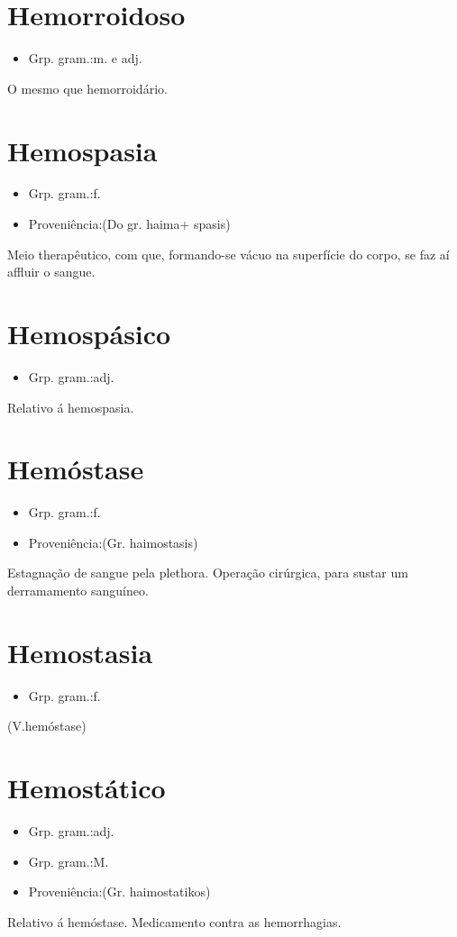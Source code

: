 \documentclass{article}
\begin{document}
\section{Hemorroidoso}
\begin{itemize}
\item {Grp. gram.:m. e adj.}
\end{itemize}
O mesmo que \textunderscore hemorroidário\textunderscore .
\section{Hemospasia}
\begin{itemize}
\item {Grp. gram.:f.}
\end{itemize}
\begin{itemize}
\item {Proveniência:(Do gr. \textunderscore haima\textunderscore  + \textunderscore spasis\textunderscore )}
\end{itemize}
Meio therapêutico, com que, formando-se vácuo na superfície do corpo, se faz aí affluir o sangue.
\section{Hemospásico}
\begin{itemize}
\item {Grp. gram.:adj.}
\end{itemize}
Relativo á hemospasia.
\section{Hemóstase}
\begin{itemize}
\item {Grp. gram.:f.}
\end{itemize}
\begin{itemize}
\item {Proveniência:(Gr. \textunderscore haimostasis\textunderscore )}
\end{itemize}
Estagnação de sangue pela plethora.
Operação cirúrgica, para sustar um derramamento sanguíneo.
\section{Hemostasia}
\begin{itemize}
\item {Grp. gram.:f.}
\end{itemize}
(V.hemóstase)
\section{Hemostático}
\begin{itemize}
\item {Grp. gram.:adj.}
\end{itemize}
\begin{itemize}
\item {Grp. gram.:M.}
\end{itemize}
\begin{itemize}
\item {Proveniência:(Gr. \textunderscore haimostatikos\textunderscore )}
\end{itemize}
Relativo á hemóstase.
Medicamento contra as hemorrhagias.
\end{document}
